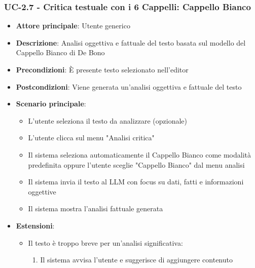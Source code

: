 \documentclass[11pt,a4paper]{article}
\begin{document}
\subsubsection{UC-2.7 - Critica testuale con i 6 Cappelli: Cappello Bianco}
\begin{itemize}
    \item \textbf{Attore principale}: Utente generico
    \item \textbf{Descrizione}: Analisi oggettiva e fattuale del testo basata sul modello del Cappello Bianco di De Bono
    \item \textbf{Precondizioni}: È presente testo selezionato nell'editor
    \item \textbf{Postcondizioni}: Viene generata un'analisi oggettiva e fattuale del testo
    \item \textbf{Scenario principale}:
        \begin{itemize}
            \item L'utente seleziona il testo da analizzare (opzionale)
            \item L'utente clicca sul menu "Analisi critica"
            \item Il sistema seleziona automaticamente il Cappello Bianco come modalità predefinita oppure l'utente sceglie "Cappello Bianco" dal menu analisi
            \item Il sistema invia il testo al LLM con focus su dati, fatti e informazioni oggettive
            \item Il sistema mostra l'analisi fattuale generata
        \end{itemize}
    \item \textbf{Estensioni}:
        \begin{itemize}
            \item Il testo è troppo breve per un'analisi significativa:
                \begin{enumerate}
                    \item Il sistema avvisa l'utente e suggerisce di aggiungere contenuto
                \end{enumerate}
        \end{itemize}
\end{itemize}
\end{document}
